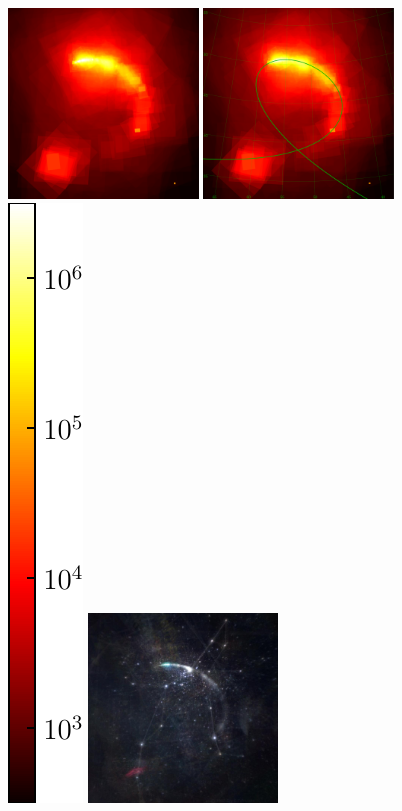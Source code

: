 \documentclass[12pt,preprint]{aastex}
\begin{document}
\clearpage
\begin{figure}
\begin{center}
\includegraphics[width=0.45\textwidth]{holmes-footprint-1.png}\hspace{1pt}%
\includegraphics[width=0.45\textwidth]{holmes-footprint-2.pdf}\hspace{1pt}%
\includegraphics[height=0.45\textwidth]{cbar.pdf}
\includegraphics[width=0.45\textwidth]{holmes-coadd-1.jpg}\hspace{1pt}%

\end{center}
\end{figure}
\end{document}
